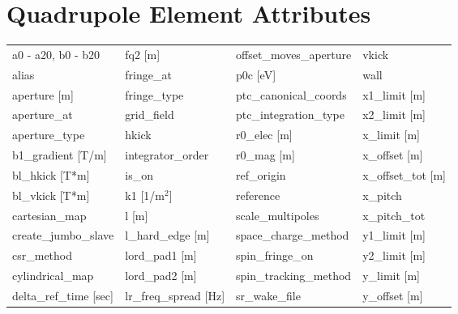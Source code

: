  \section{Quadrupole Element Attributes}
 \label{s:list.quadrupole}
 
 \begin{tabular}{llll} \toprule
a0 - a20, b0 - b20             & fq2 [m]                        & offset_moves_aperture          & vkick                          \\
alias                          & fringe_at                      & p0c [eV]                       & wall                           \\
aperture [m]                   & fringe_type                    & ptc_canonical_coords           & x1_limit [m]                   \\
aperture_at                    & grid_field                     & ptc_integration_type           & x2_limit [m]                   \\
aperture_type                  & hkick                          & r0_elec [m]                    & x_limit [m]                    \\
b1_gradient [T/m]              & integrator_order               & r0_mag [m]                     & x_offset [m]                   \\
bl_hkick [T*m]                 & is_on                          & ref_origin                     & x_offset_tot [m]               \\
bl_vkick [T*m]                 & k1 [1/m$^2$]                   & reference                      & x_pitch                        \\
cartesian_map                  & l [m]                          & scale_multipoles               & x_pitch_tot                    \\
create_jumbo_slave             & l_hard_edge [m]                & space_charge_method            & y1_limit [m]                   \\
csr_method                     & lord_pad1 [m]                  & spin_fringe_on                 & y2_limit [m]                   \\
cylindrical_map                & lord_pad2 [m]                  & spin_tracking_method           & y_limit [m]                    \\
delta_ref_time [sec]           & lr_freq_spread [Hz]            & sr_wake_file                   & y_offset [m]                   \\

\end{tabular}
